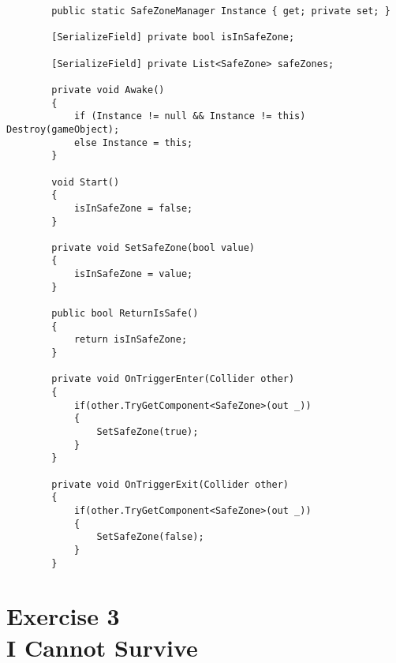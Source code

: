     \begin{verbatim}
        public static SafeZoneManager Instance { get; private set; }

        [SerializeField] private bool isInSafeZone;

        [SerializeField] private List<SafeZone> safeZones;

        private void Awake()
        {
            if (Instance != null && Instance != this) Destroy(gameObject);
            else Instance = this;
        }

        void Start()
        {
            isInSafeZone = false;
        }

        private void SetSafeZone(bool value)
        {
            isInSafeZone = value;
        }

        public bool ReturnIsSafe()
        {
            return isInSafeZone;
        }

        private void OnTriggerEnter(Collider other)
        {
            if(other.TryGetComponent<SafeZone>(out _))
            {
                SetSafeZone(true);
            }
        }

        private void OnTriggerExit(Collider other)
        {
            if(other.TryGetComponent<SafeZone>(out _))
            {
                SetSafeZone(false);
            }
        }
    \end{verbatim}

\section[Exercise 3. I Cannot Survive]{Exercise 3\\ {\large I Cannot Survive}}

